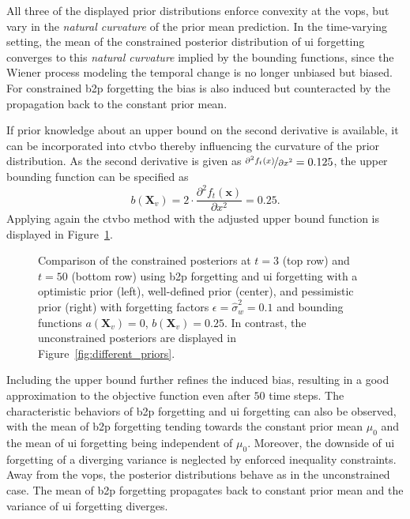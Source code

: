 All three of the displayed prior distributions enforce convexity at the \glspl{vop}, but vary in the \emph{natural curvature} of the prior mean prediction. In the time-varying setting, the mean of the constrained posterior distribution of \gls{ui} forgetting converges to this \emph{natural curvature} implied by the bounding functions, since the Wiener process modeling the temporal change is no longer unbiased but biased. For constrained \gls{b2p} forgetting the bias is also induced but counteracted by the propagation back to the constant prior mean. 

If prior knowledge about an upper bound on the second derivative is available, it can be incorporated into \gls{ctvbo} thereby influencing the curvature of the prior distribution.
As the second derivative is given as $\nicefrac{\partial^2 f_t (x)}{\partial x^2}=0.125$, the upper bounding function can be specified as
\begin{equation}
    b(\mathbf{X}_v) = 2 \cdot \frac{\partial^2 f_t(\mathbf{x})}{\partial x^2} = 0.25.
\end{equation}
Applying again the \gls{ctvbo} method with the adjusted upper bound function is displayed in Figure~\ref{fig:different_priors_constrained_bounds}.
\begin{figure}[h]
    \centering
    
    \caption[Comparing the constrained posteriors for \gls{ui} and \gls{b2p} forgetting for different prior means and an upper bound on the second derivative.]{Comparison of the constrained posteriors at $t=3$ (top row) and $t=50$ (bottom row) using \gls{b2p} forgetting and \gls{ui} forgetting with a optimistic prior (left), well-defined prior (center), and pessimistic prior (right) with forgetting factors $\epsilon=\hat{\sigma}_w^2=0.1$ and bounding functions $a(\mathbf{X}_v) = 0$, $b(\mathbf{X}_v) = 0.25$. In contrast, the unconstrained posteriors are displayed in Figure~\ref{fig:different_priors}.}
    \label{fig:different_priors_constrained_bounds}
\end{figure}
Including the upper bound further refines the induced bias, resulting in a good approximation to the objective function even after $50$ time steps. The characteristic behaviors of \gls{b2p} forgetting and \gls{ui} forgetting can also be observed, with the mean of \gls{b2p} forgetting tending towards the constant prior mean $\mu_0$ and the mean of \gls{ui} forgetting being independent of $\mu_0$. Moreover, the downside of \gls{ui} forgetting of a diverging variance is neglected by enforced inequality constraints. Away from the \glspl{vop}, the posterior distributions behave as in the unconstrained case. The mean of \gls{b2p} forgetting propagates back to constant prior mean and the variance of \gls{ui} forgetting diverges.

